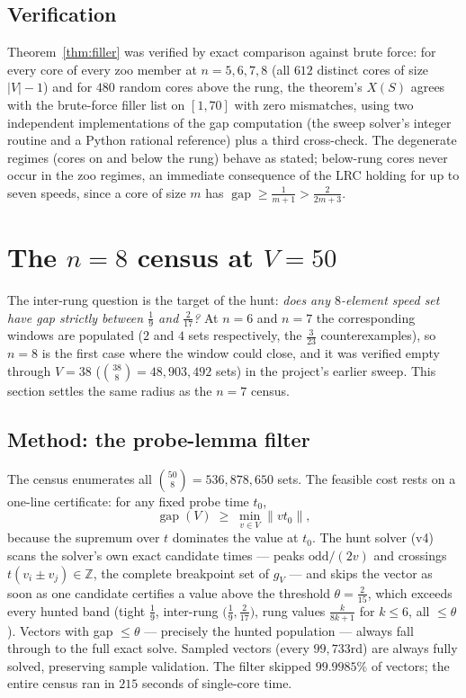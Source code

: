\documentclass[11pt,a4paper]{article}
\theoremstyle{plain}
\theoremstyle{definition}
\theoremstyle{remark}
\newcommand{\norm}[1]{\lVert #1 \rVert}
\newcommand{\gap}{\operatorname{gap}}
\newcommand{\Z}{\mathbb{Z}}
\begin{document}
\subsection{Verification}

Theorem~\ref{thm:filler} was verified by exact comparison against brute
force: for every core of every zoo member at $n = 5, 6, 7, 8$ (all $612$
distinct cores of size $|V| - 1$) and for $480$ random cores above the
rung, the theorem's $X(S)$ agrees with the brute-force filler list on
$[1, 70]$ with zero mismatches, using two independent implementations of
the gap computation (the sweep solver's integer routine and a Python
rational reference) plus a third cross-check. The degenerate regimes (cores
on and below the rung) behave as stated; below-rung cores never occur in
the zoo regimes, an immediate consequence of the LRC holding for up to
seven speeds, since a core of size $m$ has $\gap \ge \tfrac1{m+1} >
\tfrac{2}{2m+3}$.

\section{The \texorpdfstring{$n = 8$}{n=8} census at \texorpdfstring{$V = 50$}{V=50}}\label{sec:census}

The inter-rung question is the target of the hunt: \emph{does any $8$-element
speed set have gap strictly between $\tfrac19$ and $\tfrac{2}{17}$?} At $n =
6$ and $n = 7$ the corresponding windows are populated ($2$ and $4$ sets
respectively, the $\tfrac{3}{23}$ counterexamples), so $n = 8$ is the first
case where the window could close, and it was verified empty through $V =
38$ ($\binom{38}{8} = 48{,}903{,}492$ sets) in the project's earlier sweep.
This section settles the same radius as the $n = 7$ census.

\subsection{Method: the probe-lemma filter}

The census enumerates all $\binom{50}{8} = 536{,}878{,}650$ sets. The
feasible cost rests on a one-line certificate: for any fixed probe time
$t_0$,
\[
  \gap(V) \;\ge\; \min_{v \in V} \norm{v t_0},
\]
because the supremum over $t$ dominates the value at $t_0$. The hunt solver
(v4) scans the solver's own exact candidate times --- peaks
$\text{odd}/(2v)$ and crossings $t(v_i \pm v_j) \in \Z$, the complete
breakpoint set of $g_V$ --- and skips the vector as soon as one candidate
certifies a value above the threshold $\theta = \tfrac{2}{15}$, which
exceeds every hunted band (tight $\tfrac19$, inter-rung $\bigl(\tfrac19,
\tfrac{2}{17}\bigr)$, rung values $\tfrac{k}{8k+1}$ for $k \le 6$, all
$\le \theta$). Vectors with gap $\le \theta$ --- precisely the hunted
population --- always fall through to the full exact solve. Sampled vectors
(every $99{,}733$rd) are always fully solved, preserving sample validation.
The filter skipped $99.9985\%$ of vectors; the entire census ran in
$215$ seconds of single-core time.
\end{document}
